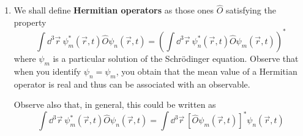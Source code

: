 \documentclass[../psets.tex]{subfiles}
\begin{document}
\begin{enumerate}
\begin{enumerate}
\begin{proof}
            Taking the hint, we have that
            \begin{align*}
                E-\Exp{V} &= E\cdot 1-\Exp{V}\\
                &= E\cdot\int\dd^3\vec{r}\ \psi^*\psi-\int\dd^3\vec{r}\ \psi^*V\psi\\
                &= \int\dd^3\vec{r}\ \psi^*(E-V)\psi\\
                &= \int\dd^3\vec{r}\ \psi^*\left( \frac{\hat{\vec{p}}{\,}^2}{2m} \right)\psi\\
                &= \frac{1}{2m}\int\dd^3\vec{r}\ \psi^*(-\hbar^2\vec{\nabla}^2)\psi\\
                &= \frac{1}{2m}\int\dd^3\vec{r}\ |\vec{\nabla}(\hbar\psi)|^2\tag*{Part (a)}\\
                &> 0
            \end{align*}
            Taking the hint again, we have that
            \begin{equation*}
                \Exp{V} > V_\text{min}
            \end{equation*}
            Therefore, by transitivity, we have that
            \begin{align*}
                E-\Exp{V} &> 0\\
                E &> \Exp{V} > V_\text{min}
            \end{align*}
            as desired.
        \end{proof}
    \end{enumerate}
    \item We shall define \textbf{Hermitian operators} as those ones $\hat{O}$ satisfying the property
    \begin{equation}\label{eqn:HermitianDef}
        \int\dd^3\vec{r}\ \psi_m^*(\vec{r},t)\hat{O}\psi_n(\vec{r},t) = \left( \int\dd^3\vec{r}\ \psi_n^*(\vec{r},t)\hat{O}\psi_m(\vec{r},t) \right)^*
    \end{equation}
    where $\psi_m$ is a particular solution of the Schr\"{o}dinger equation. Observe that when you identify $\psi_n=\psi_m$, you obtain that the mean value of a Hermitian operator is real and thus can be associated with an observable.\par
    Observe also that, in general, this could be written as
    \begin{equation*}
        \int\dd^3\vec{r}\ \psi_m^*(\vec{r},t)\hat{O}\psi_n(\vec{r},t) = \int\dd^3\vec{r}\ [\hat{O}\psi_m(\vec{r},t)]^*\psi_n(\vec{r},t)
    \end{equation*}

\end{enumerate}
\end{document}
